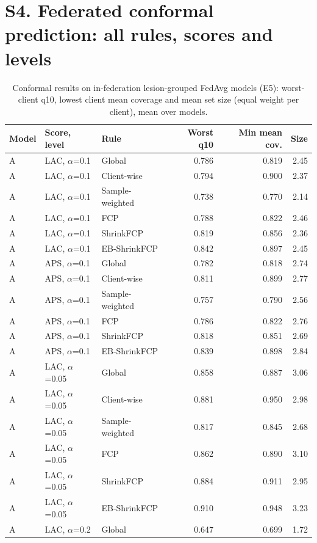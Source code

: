 \documentclass[10pt]{article}
\begin{document}
\section*{S4. Federated conformal prediction: all rules, scores and levels}
\begin{table}[!htbp]
\centering
\scriptsize
\caption{Conformal results on in-federation lesion-grouped FedAvg models (E5): worst-client q10, lowest client mean coverage and mean set size (equal weight per client), mean over models.}
\label{tab:s5E5}
\begin{tabular}{@{}lllrrr@{}}
\toprule
Model & Score, level & Rule & Worst q10 & Min mean cov. & Size \\
\midrule
A & LAC, $\alpha$=0.1 & Global & 0.786 & 0.819 & 2.45 \\
A & LAC, $\alpha$=0.1 & Client-wise & 0.794 & 0.900 & 2.37 \\
A & LAC, $\alpha$=0.1 & Sample-weighted & 0.738 & 0.770 & 2.14 \\
A & LAC, $\alpha$=0.1 & FCP & 0.788 & 0.822 & 2.46 \\
A & LAC, $\alpha$=0.1 & ShrinkFCP & 0.819 & 0.856 & 2.36 \\
A & LAC, $\alpha$=0.1 & EB-ShrinkFCP & 0.842 & 0.897 & 2.45 \\
\midrule
A & APS, $\alpha$=0.1 & Global & 0.782 & 0.818 & 2.74 \\
A & APS, $\alpha$=0.1 & Client-wise & 0.811 & 0.899 & 2.77 \\
A & APS, $\alpha$=0.1 & Sample-weighted & 0.757 & 0.790 & 2.56 \\
A & APS, $\alpha$=0.1 & FCP & 0.786 & 0.822 & 2.76 \\
A & APS, $\alpha$=0.1 & ShrinkFCP & 0.818 & 0.851 & 2.69 \\
A & APS, $\alpha$=0.1 & EB-ShrinkFCP & 0.839 & 0.898 & 2.84 \\
\midrule
A & LAC, $\alpha$=0.05 & Global & 0.858 & 0.887 & 3.06 \\
A & LAC, $\alpha$=0.05 & Client-wise & 0.881 & 0.950 & 2.98 \\
A & LAC, $\alpha$=0.05 & Sample-weighted & 0.817 & 0.845 & 2.68 \\
A & LAC, $\alpha$=0.05 & FCP & 0.862 & 0.890 & 3.10 \\
A & LAC, $\alpha$=0.05 & ShrinkFCP & 0.884 & 0.911 & 2.95 \\
A & LAC, $\alpha$=0.05 & EB-ShrinkFCP & 0.910 & 0.948 & 3.23 \\
\midrule
A & LAC, $\alpha$=0.2 & Global & 0.647 & 0.699 & 1.72 \\

\end{tabular}
\end{table}
\end{document}
